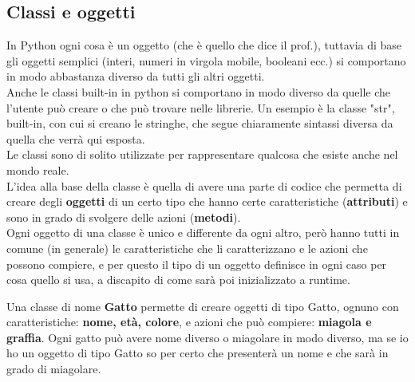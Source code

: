 \documentclass[10pt]{extarticle}
\newcommand{\<}{\langle}
\renewcommand{\>}{\rangle}
\theoremstyle{mystyle}{\newtheorem*{remark}{Nota}}
\theoremstyle{mystyle}{\newtheorem*{remarks}{Note}}
\theoremstyle{mystyle}{\newtheorem*{example}{Esempio}}
\theoremstyle{mystyle}{\newtheorem*{examples}{Esempi}}
\theoremstyle{definition}{\newtheorem*{exercise}{Exercise}}
\theoremstyle{warn}
\begin{document}
\subsection{Classi e oggetti}
In Python ogni cosa è un oggetto (che è quello che dice il prof.), tuttavia di base gli oggetti semplici (interi, numeri in virgola mobile, booleani ecc.) si comportano in modo abbastanza diverso da tutti gli altri oggetti.\\
Anche le classi built-in in python si comportano in modo diverso da quelle che l'utente può creare o che può trovare nelle librerie. Un esempio è la classe "str", built-in, con cui si creano le stringhe, che segue chiaramente sintassi diversa da quella che verrà qui esposta.\\
Le classi sono di solito utilizzate per rappresentare qualcosa che esiste anche nel mondo reale.\\
L'idea alla base della classe è quella di avere una parte di codice che permetta di creare degli \textbf{oggetti} di un certo tipo che hanno certe caratteristiche (\textbf{attributi}) e sono in grado di svolgere delle azioni (\textbf{metodi}).\\
Ogni oggetto di una classe è unico e differente da ogni altro, però hanno tutti in comune (in generale) le caratteristiche che li caratterizzano e le azioni che possono compiere, e per questo il tipo di un oggetto definisce in ogni caso per cosa quello si usa, a discapito di come sarà poi inizializzato a runtime.
\begin{example}
Una classe di nome \textbf{Gatto} permette di creare oggetti di tipo Gatto, ognuno con caratteristiche: \textbf{nome, età, colore}, e azioni che può compiere: \textbf{miagola e graffia}. Ogni gatto può avere nome diverso o miagolare in modo diverso, ma se io ho un oggetto di tipo Gatto so per certo che presenterà un nome e che sarà in grado di miagolare.
\end{example}
\end{document}
